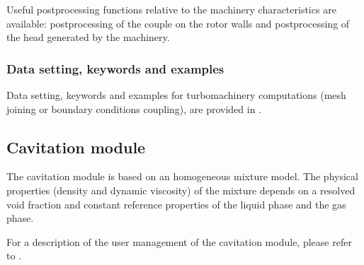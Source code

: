 Useful postprocessing functions relative to the machinery
characteristics are available: postprocessing of the couple on the
rotor walls and postprocessing of the head generated by the machinery.

\subsubsection{Data setting, keywords and examples}\label{tbm_date_setting}
Data setting, keywords and examples for turbomachinery computations
(mesh joining or boundary conditions coupling), are provided in
.

\subsection{Cavitation module}

The cavitation module is based on an homogeneous mixture model. The
physical properties (density and dynamic viscosity) of the mixture
depends on a resolved void fraction and constant reference properties
of the liquid phase and the gas phase.

For a description of the user management of the cavitation module,
please refer to .
